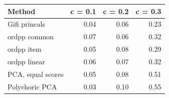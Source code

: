 \begin{tabular}{lrrr}
\toprule
Method & c = 0.1 & c = 0.2 & c = 0.3 \\
\midrule
Gifi princals & 0.04 & 0.06 & 0.23 \\
ordpp common & 0.07 & 0.06 & 0.32 \\
ordpp item & 0.05 & 0.08 & 0.29 \\
ordpp linear & 0.06 & 0.07 & 0.32 \\
PCA, equal scores & 0.05 & 0.08 & 0.51 \\
Polychoric PCA & 0.03 & 0.10 & 0.55 \\
\bottomrule
\end{tabular}
